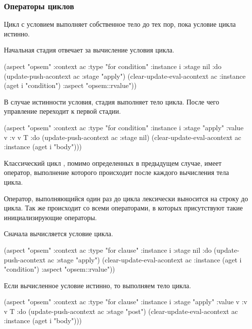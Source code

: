 \documentclass[12pt,twoside,russian]{article}
\newcommand{\textGoKeyword}[1]{{\color{goPurple}\textbf{#1}}}
\newcommand{\textABMLString}[1]{{\color{abmlString}#1}}
\newcommand{\GoKeyword}[1]{\goinline{\textGoKeyword{#1}}}
\newcommand{\ABMLString}[1]{\abmlinline{\textABMLString{#1}}}
\begin{document}
\subsubsection{Операторы циклов}

Цикл с условием выполняет собственное тело до тех пор, пока условие цикла истинно.

Начальная стадия отвечает за вычисление условия цикла.

\begin{ABMLCode}
(aspect "opsem" :context ac :type "for condition" :instance i 
  :stage nil :do 
  (update-push-acontext ac :stage "apply")
  (clear-update-eval-acontext ac :instance (aget i "condition") :aspect "opsem::rvalue"))
\end{ABMLCode}

В случае истинности условия, стадия \ABMLString{apply} выполняет тело цикла. После чего управление переходит к первой стадии.

\begin{ABMLCode}
(aspect "opsem" :context ac :type "for condition" :instance i 
  :stage "apply" :value v :v v T :do 
  (update-push-acontext ac :stage nil)
  (clear-update-eval-acontext ac :instance (aget i "body")))
\end{ABMLCode}

Классический цикл \GoKeyword{for}, помимо определенных в предыдущем случае, имеет оператор, выполнение которого происходит после каждого вычисления тела цикла.

Оператор, выполняющийся один раз до цикла лексически выносится на строку до цикла. Так же происходит со всеми операторами, в которых присутствуют такие инициализирующие операторы.

Сначала вычисляется условие цикла.

\begin{ABMLCode}
(aspect "opsem" :context ac :type "for clause" :instance i 
  :stage nil :do 
  (update-push-acontext ac :stage "apply")
  (clear-update-eval-acontext ac :instance (aget i "condition") :aspect "opsem::rvalue"))
\end{ABMLCode}

Если вычисленное условие истинно, то выполняем тело цикла.

\begin{ABMLCode}
(aspect "opsem" :context ac :type "for clause" :instance i 
  :stage "apply" :value v :v v T :do 
  (update-push-acontext ac :stage "post")
  (clear-update-eval-acontext ac :instance (aget i "body")))
\end{ABMLCode}
\end{document}
